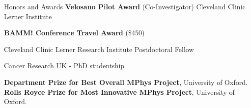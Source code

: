 \begin{rubric}{Honors and Awards}
\entry*[2022-2023] \textbf{Velosano Pilot Award} (Co-Investigator) Cleveland Clinic Lerner Institute

\entry*[2022] \textbf{BAMM! Conference Travel Award} (\$450)

\entry*[2021-present] Cleveland Clinic Lerner Research Institute Postdoctoral Fellow 

\entry*[2015-2020] Cancer Research UK - PhD studentship 

\entry*[2015] \textbf{Department Prize for Best Overall MPhys Project}, University of Oxford.
%
\entry*[2015] \textbf{Rolls Royce Prize for Most Innovative MPhys Project}, University of Oxford.

\end{rubric}